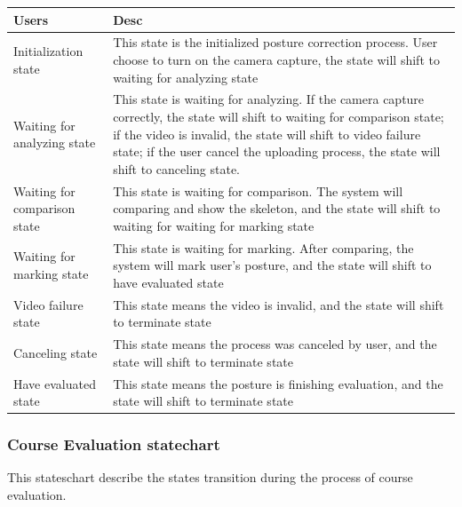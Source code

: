 \documentclass[16pt]{scrreprt}
\begin{document}
\begin{center}
    \begin{tabular}{p{5cm}p{12cm}}
        \hline
        Users & Desc\\
        \hline
        Initialization state &  This state is the initialized posture correction process. User choose to turn on the camera capture, the state will shift to waiting for analyzing state \\
        \hline
        Waiting for analyzing state & This state is waiting for analyzing. If the camera capture correctly, the state will shift to waiting for comparison state; if the video is invalid, the state will shift to video failure state; if the user cancel the uploading process, the state will shift to canceling state.\\
        \hline
        Waiting for comparison state & This state is waiting for comparison. The system will comparing and show the skeleton, and the state will shift to waiting for waiting for marking state\\
        \hline
        Waiting for marking state & This state is waiting for marking. After comparing, the system will mark user's posture, and the state will shift to have evaluated state\\
        \hline
        Video failure state & This state means the video is invalid, and the state will shift to terminate state\\
        \hline
        Canceling state & This state means the process was canceled by user, and the state will shift to terminate state\\
        \hline
        Have evaluated state & This state means the posture is finishing evaluation, and the state will shift to terminate state\\
        \hline
    \end{tabular}
\end{center}

\subsubsection{Course Evaluation statechart}

This stateschart describe the states transition during the process of course evaluation.
\end{document}
